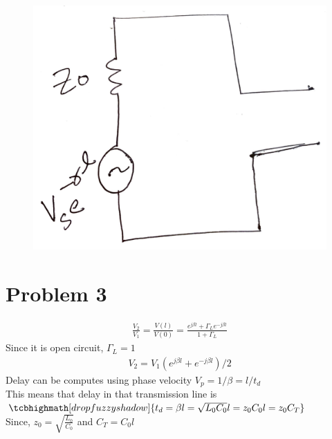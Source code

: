 \documentclass{article}
\begin{document}
\begin{figure}[H]
	\includegraphics[scale=0.2]{th.png}
\end{figure}
\section*{\hfil Problem 3}
\begin{gather}
\frac{V_2}{V_1} = \frac{V(l)}{V(0)} = \frac{e^{j\beta l} + \Gamma _Le^{-j\beta l}}{1 + \Gamma _L}
\end{gather}
Since it is open circuit, $\Gamma _L = 1$
\begin{gather}
V_2 = V_1(e^{j\beta l} + e^{-j\beta l})/2
\end{gather}
Delay can be computes using phase velocity $V_p = 1/\beta = l/t_d$\\
This means that delay in that transmission line is $\tcbhighmath[drop fuzzy shadow]{t_d = \beta l = \sqrt{L_0C_0}l = z_0C_0 l = z_0C_T}$\\
Since, $z_0 = \sqrt{\frac{L_0}{C_0}}$ and $C_T = C_0l$
\end{document}

